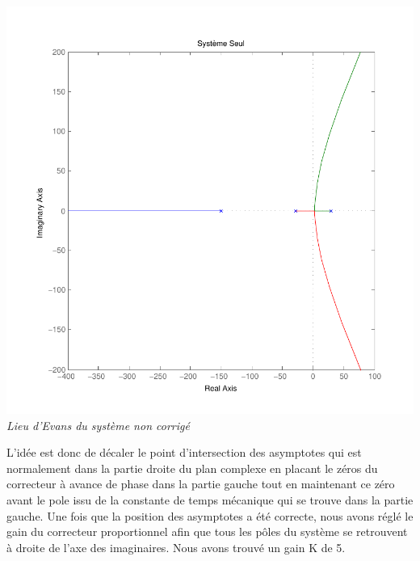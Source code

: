 \documentclass[11pt, french]{article} %
\begin{document}
\begin{center}
\includegraphics [scale=0.50]{RL_Sys_Seul.pdf}
\\
\emph{Lieu d'Evans du système non corrigé}
\end{center}

L'idée est donc de décaler le point d'intersection des asymptotes qui est normalement dans la partie droite du plan complexe en placant le zéros du correcteur à avance de phase dans la partie gauche tout en maintenant ce zéro avant le pole issu de la constante de temps mécanique qui se trouve dans la partie gauche. Une fois que la position des asymptotes a été correcte, nous avons réglé le gain du correcteur proportionnel afin que tous les pôles du système se retrouvent à droite de l'axe des imaginaires. Nous avons trouvé un gain K de 5. 
\end{document}
